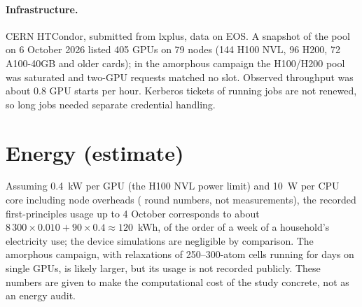 \paragraph{Infrastructure.} CERN HTCondor, submitted from lxplus, data on EOS. A snapshot of the pool on 6 October
2026 listed 405 GPUs on 79 nodes (144 H100 NVL, 96 H200, 72 A100-40GB and older cards); in the amorphous campaign the
H100/H200 pool was saturated and two-GPU requests matched no slot. Observed throughput was about 0.8 GPU starts per hour.
Kerberos tickets of running jobs are not renewed, so long jobs needed separate credential handling.

\section{Energy (estimate)}
\label{sec:mono-res-energy}

Assuming 0.4~kW per GPU (the H100 NVL power limit) and 10~W per CPU core including node overheads (
round numbers, not measurements), the recorded first-principles usage up to 4 October corresponds to about
$8\,300\times0.010 + 90\times0.4 \approx 120$~kWh, of the order of a week of a household's electricity use; the device
simulations are negligible by comparison. The amorphous campaign, with relaxations of 250--300-atom cells running for days
on single GPUs, is likely larger, but its usage is not recorded publicly. These numbers are given to make the
computational cost of the study concrete, not as an energy audit.
